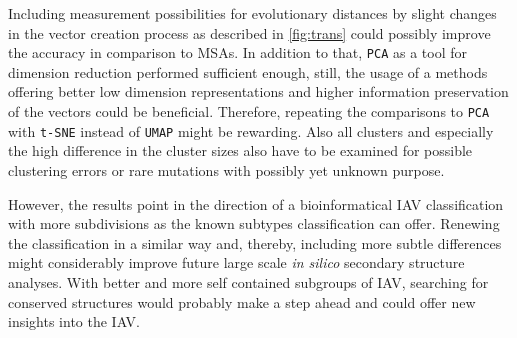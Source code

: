 \vspace{1em}

Including measurement possibilities for evolutionary distances by slight changes in the vector creation process as described in \autoref{fig:trans} could possibly improve the accuracy in comparison to \glspl{MSA}. %
In addition to that, \texttt{PCA} as a tool for dimension reduction performed sufficient enough, still, the usage of a methods offering better low dimension representations and higher information preservation of the vectors could be beneficial. Therefore, repeating the comparisons to \texttt{PCA} with \texttt{t-SNE} instead of \texttt{UMAP} might be rewarding. Also all clusters and especially the high difference in the cluster sizes also have to be examined for possible clustering errors or rare mutations with possibly yet unknown purpose. 

\vspace{1em}

However, the results point in the direction of a bioinformatical \gls{IAV} classification with more subdivisions as the known subtypes classification can offer. Renewing the classification in a similar way and, thereby, including more subtle differences might considerably improve future large scale  \textit{in silico} secondary structure analyses. With better and more self contained subgroups of \gls{IAV}, searching for conserved structures would probably make a step ahead and could offer new insights into the \gls{IAV}.






